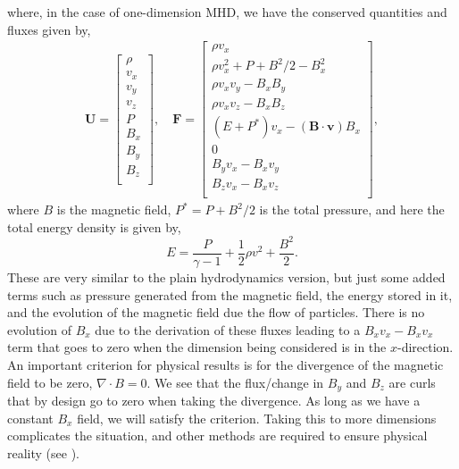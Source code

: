 \documentclass[iop,twocolumn]{emulateapj}
\begin{document}
where, in the case of one-dimension MHD, we have the conserved quantities and fluxes given by,
\begin{align*}
  {\bm U}=
  \begin{bmatrix}
    \rho \\
    v_x\\
    v_y\\
    v_z\\
    P\\
    B_x\\
    B_y\\
    B_z\\
  \end{bmatrix}
  ,\quad {\bm F}=
  \begin{bmatrix}
    \rho v_x \\
    \rho v_x^2+P+B^2/2-B_x^2\\
    \rho v_xv_y-B_xB_y\\
    \rho v_xv_z-B_xB_z\\
    (E+P^*)v_x-({\bm B}\cdot{\bm v})B_x\\
    0\\
    B_yv_x-B_xv_y\\
    B_zv_x-B_xv_z\\
  \end{bmatrix},
\end{align*}
where $B$ is the magnetic field, $P^*=P+B^2/2$ is the total pressure, and here the total energy density is given by,
\begin{equation*}
  E=\frac{P}{\gamma-1}+\frac{1}{2}\rho v^2+\frac{B^2}{2}.
\end{equation*}
These are very similar to the plain hydrodynamics version, but just some added terms such as pressure generated from the magnetic field, the energy stored in it, and the evolution of the magnetic field due the flow of particles. There is no evolution of $B_x$ due to the derivation of these fluxes leading to a $B_xv_x-B_xv_x$ term that goes to zero when the dimension being considered is in the $x$-direction. An important criterion for physical results is for the divergence of the magnetic field to be zero, $\nabla\cdot B=0$. We see that the flux/change in $B_y$ and $B_z$ are curls that by design go to zero when taking the divergence. As long as we have a constant $B_x$ field, we will satisfy the criterion. Taking this to more dimensions complicates the situation, and other methods are required to ensure physical reality (see \cite{stone08a}).
\end{document}
